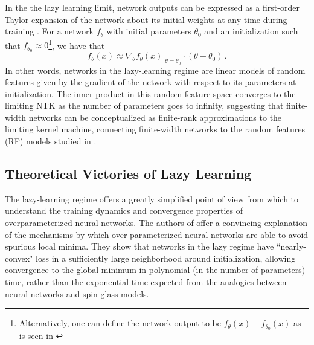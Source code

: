 \documentclass[a4paper, 12pt]{article}
\begin{document}
In the the lazy learning limit, network outputs can be expressed as a first-order Taylor expansion of the network about its initial weights at any time during training \cite{leeWideNeuralNetworks2019}. For a network $f_\theta$ with initial parameters $\theta_0$ and an initialization such that $f_{\theta_0} \approx 0$\footnote{Alternatively, one can define the network output to be $f_{\theta}(x) - f_{\theta_0}(x)$ as is seen in \cite{chizatLazyTrainingDifferentiable2020}}, we have that
\begin{equation}
    f_\theta(x) \approx \nabla_\theta \left.f_\theta(x)\right|_{\theta=\theta_0} \cdot (\theta - \theta_0)\,.
\end{equation}
In other words, networks in the lazy-learning regime are linear models of random features given by the gradient of the network with respect to its parameters at initialization. The inner product in this random feature space converges to the limiting NTK as the number of parameters goes to infinity, suggesting that finite-width networks can be conceptualized as finite-rank approximations to the limiting kernel machine, connecting finite-width networks to the random features (RF) models studied in \cite{rahimiRandomFeaturesLargeScale2008,meiGeneralizationErrorRandom2019}.

\subsection{Theoretical Victories of Lazy Learning}

The lazy-learning regime offers a greatly simplified point of view from which to understand the training dynamics and convergence properties of overparameterized neural networks. The authors of \cite{allen-zhuConvergenceTheoryDeep2019} offer a convincing explanation of the mechanisms by which over-parameterized neural networks are able to avoid spurious local minima. They show that networks in the lazy regime have ``nearly-convex" loss in a sufficiently large neighborhood around initialization, allowing convergence to the global minimum in polynomial (in the number of parameters) time, rather than the exponential time expected from the analogies between neural networks and spin-glass models.\\
\end{document}
